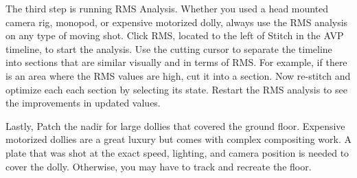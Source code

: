\begin{fullwidth}




\clearpage
The third step is running RMS Analysis. Whether you used a head mounted camera rig, monopod, or expensive motorized dolly, always use the RMS analysis on any type of moving shot. Click RMS, located to the left of Stitch in the AVP timeline, to start the analysis. Use the cutting cursor to separate the timeline into sections that are similar visually and in terms of RMS. For example, if there is an area where the RMS values are high, cut it into a section. Now re-stitch and optimize each each section by selecting its state. Restart the RMS analysis to see the improvements in updated values.


Lastly, Patch the nadir for large dollies that covered the ground floor. Expensive motorized dollies are a great luxury but comes with complex compositing work. A plate that was shot at the exact speed, lighting, and camera position is needed to cover the dolly. Otherwise, you may have to track and recreate the floor.


\clearpage
\end{fullwidth}